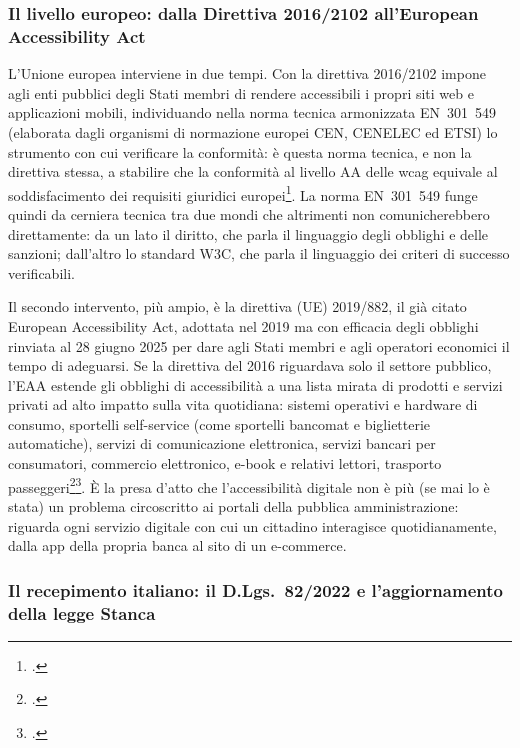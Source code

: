 \subsubsection{Il livello europeo: dalla Direttiva 2016/2102 all'European Accessibility Act}

L'Unione europea interviene in due tempi. Con la direttiva 2016/2102 impone agli enti pubblici degli Stati membri di rendere accessibili i propri siti web e applicazioni mobili, individuando nella norma tecnica armonizzata EN~301~549 (elaborata dagli organismi di normazione europei CEN, CENELEC ed ETSI) lo strumento con cui verificare la conformità: è questa norma tecnica, e non la direttiva stessa, a stabilire che la conformità al livello AA delle \gls{wcag} equivale al soddisfacimento dei requisiti giuridici europei\footcite[§~9.0: \enquote{La conformità con il livello AA delle W3C Web Content Accessibility Guidelines (WCAG 2.1) è equivalente alla conformità con tutti i punti da 9.1 a 9.4 e ai requisiti di conformità di cui al punto 9.6 del presente documento}]{norma:en301549}. La norma EN~301~549 funge quindi da cerniera tecnica tra due mondi che altrimenti non comunicherebbero direttamente: da un lato il diritto, che parla il linguaggio degli obblighi e delle sanzioni; dall'altro lo standard W3C, che parla il linguaggio dei criteri di successo verificabili.

Il secondo intervento, più ampio, è la direttiva (UE) 2019/882, il già citato European Accessibility Act, adottata nel 2019 ma con efficacia degli obblighi rinviata al 28 giugno 2025 per dare agli Stati membri e agli operatori economici il tempo di adeguarsi. Se la direttiva del 2016 riguardava solo il settore pubblico, l'EAA estende gli obblighi di accessibilità a una lista mirata di prodotti e servizi privati ad alto impatto sulla vita quotidiana: sistemi operativi e hardware di consumo, sportelli self-service (come sportelli bancomat e biglietterie automatiche), servizi di comunicazione elettronica, servizi bancari per consumatori, commercio elettronico, e-book e relativi lettori, trasporto passeggeri\footcite[art.~2]{direttiva:eaa}\footcite[art.~1, commi~2-3]{dlgs:82-2022}. È la presa d'atto che l'accessibilità digitale non è più (se mai lo è stata) un problema circoscritto ai portali della pubblica amministrazione: riguarda ogni servizio digitale con cui un cittadino interagisce quotidianamente, dalla app della propria banca al sito di un e-commerce.

\subsubsection{Il recepimento italiano: il D.Lgs.~82/2022 e l'aggiornamento della legge Stanca}

